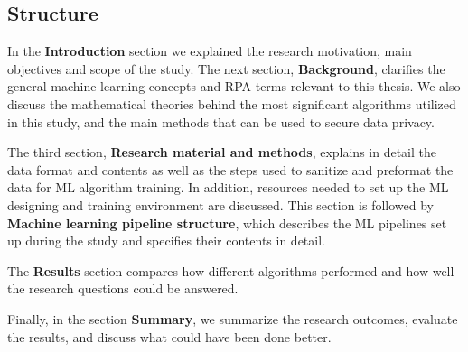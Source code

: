 
\subsection{Structure}\label{subsec:intro-structure}

In the \textbf{Introduction} section
we explained the research motivation,
main objectives and scope of the study.
The next section, \textbf{Background},
clarifies the general machine learning concepts
and RPA terms relevant to this thesis.
We also discuss the mathematical theories
behind the most significant algorithms utilized in this study,
and the main methods that can be used to secure data privacy.

The third section,
\textbf{Research material and methods},
explains in detail the data format and contents
as well as the steps used to sanitize and preformat the data
for ML algorithm training.
In addition,
resources needed to set up the ML designing and training environment
are discussed.
This section is followed by \textbf{Machine learning pipeline structure},
which describes the ML pipelines set up during the study
and specifies their contents in detail.

The \textbf{Results} section compares how different algorithms performed
and how well the research questions could be answered.

Finally,
in the section \textbf{Summary},
we summarize the research outcomes,
evaluate the results,
and discuss what could have been done better.

\clearpage
